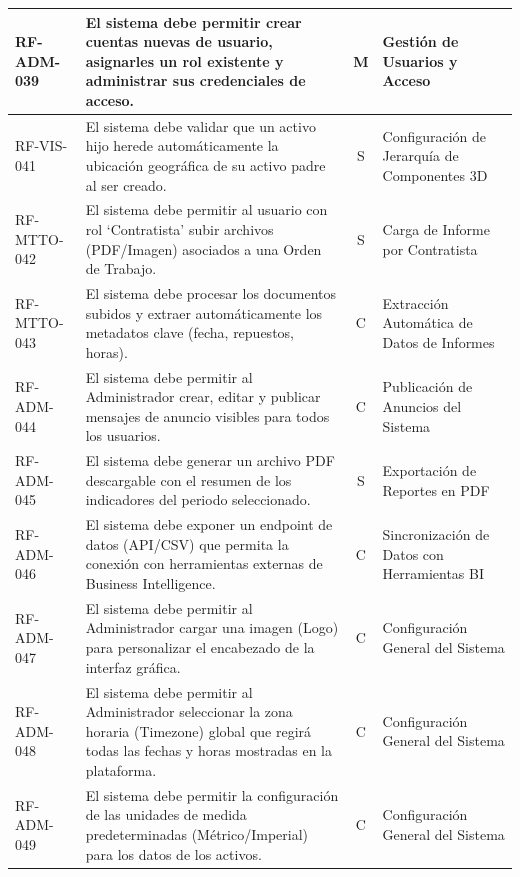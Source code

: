 \begin{longtable}{|p{2.2cm}|p{8.5cm}|c|p{3.5cm}|}
RF-ADM-039 & El sistema debe permitir crear cuentas nuevas de usuario, asignarles un rol existente y administrar sus credenciales de acceso. & M & Gestión de Usuarios y Acceso \\ \hline
RF-VIS-041 & El sistema debe validar que un activo hijo herede automáticamente la ubicación geográfica de su activo padre al ser creado. & S & Configuración de Jerarquía de Componentes 3D \\ \hline
RF-MTTO-042 & El sistema debe permitir al usuario con rol `Contratista' subir archivos (PDF/Imagen) asociados a una Orden de Trabajo. & S & Carga de Informe por Contratista \\ \hline
RF-MTTO-043 & El sistema debe procesar los documentos subidos y extraer automáticamente los metadatos clave (fecha, repuestos, horas). & C & Extracción Automática de Datos de Informes \\ \hline
RF-ADM-044 & El sistema debe permitir al Administrador crear, editar y publicar mensajes de anuncio visibles para todos los usuarios. & C & Publicación de Anuncios del Sistema \\ \hline
RF-ADM-045 & El sistema debe generar un archivo PDF descargable con el resumen de los indicadores del periodo seleccionado. & S & Exportación de Reportes en PDF \\ \hline
RF-ADM-046 & El sistema debe exponer un endpoint de datos (API/CSV) que permita la conexión con herramientas externas de Business Intelligence. & C & Sincronización de Datos con Herramientas BI \\ \hline
RF-ADM-047 & El sistema debe permitir al Administrador cargar una imagen (Logo) para personalizar el encabezado de la interfaz gráfica. & C & Configuración General del Sistema \\ \hline
RF-ADM-048 & El sistema debe permitir al Administrador seleccionar la zona horaria (Timezone) global que regirá todas las fechas y horas mostradas en la plataforma. & C & Configuración General del Sistema \\ \hline
RF-ADM-049 & El sistema debe permitir la configuración de las unidades de medida predeterminadas (Métrico/Imperial) para los datos de los activos. & C & Configuración General del Sistema \\ \hline
\end{longtable}
\normalsize

